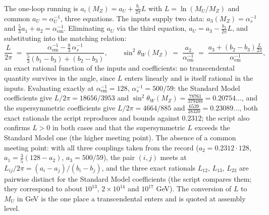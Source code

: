 The one-loop running is $a_{i}(M_{Z}) = a_{U} + \tfrac{b_{i}}{2\pi} L$ with $L = \ln(M_{U}/M_{Z})$ and common $a_{U} = \alpha_{U}^{-1}$, three equations. The inputs supply two data: $a_{3}(M_{Z}) = \alpha_{s}^{-1}$ and $\tfrac53 a_{1} + a_{2} = \alpha_{\mathrm{em}}^{-1}$. Eliminating $a_{U}$ via the third equation, $a_{U} = a_{3} - \tfrac{b_{3}}{2\pi}L$, and substituting into the matching relation:
\[
\frac{L}{2\pi} \;=\; \frac{\alpha_{\mathrm{em}}^{-1} - \tfrac83\, \alpha_{s}^{-1}}{\tfrac53(b_{1} - b_{3}) + (b_{2} - b_{3})},
\qquad
\sin^{2}\theta_{W}(M_{Z}) \;=\; \frac{a_{2}}{\alpha_{\mathrm{em}}^{-1}} \;=\; \frac{a_{3} + (b_{2} - b_{3})\tfrac{L}{2\pi}}{\alpha_{\mathrm{em}}^{-1}},
\]
an exact rational function of the inputs and coefficients: no transcendental quantity survives in the angle, since $L$ enters linearly and is itself rational in the inputs. Evaluating exactly at $\alpha_{\mathrm{em}}^{-1} = 128$, $\alpha_{s}^{-1} = 500/59$: the Standard Model coefficients give $L/2\pi = 18656/3953$ and $\sin^{2}\theta_{W}(M_{Z}) = \tfrac{78761}{379488} = 0.20754\ldots$, and the supersymmetric coefficients give $L/2\pi = 4664/885$ and $\tfrac{6539}{28320} = 0.23089\ldots$, both exact rationals the script reproduces and bounds against $0.2312$; the script also confirms $L > 0$ in both cases and that the supersymmetric $L$ exceeds the Standard Model one (the higher meeting point). The absence of a common meeting point: with all three couplings taken from the record ($a_{2} = 0.2312 \cdot 128$, $a_{1} = \tfrac35(128 - a_{2})$, $a_{3} = 500/59$), the pair $(i, j)$ meets at $L_{ij}/2\pi = (a_{i} - a_{j})/(b_{i} - b_{j})$, and the three exact rationals $L_{12}$, $L_{13}$, $L_{23}$ are pairwise distinct for the Standard Model coefficients (the script compares them; they correspond to about $10^{13}$, $2 \times 10^{14}$ and $10^{17}$ GeV). The conversion of $L$ to $M_{U}$ in GeV is the one place a transcendental enters and is quoted at assembly level.
